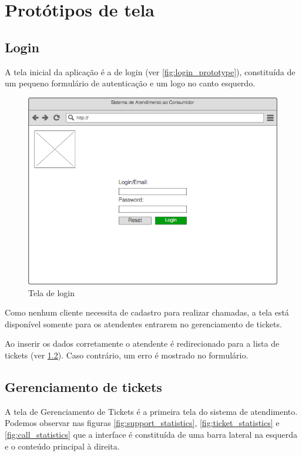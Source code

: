 \newpage
\section{Protótipos de tela}

\subsection{Login}

A tela inicial da aplicação é a de login (ver \autoref{fig:login_prototype}), constituída de um pequeno formulário de autenticação e um logo no canto esquerdo. 

\begin{figure}[ht!]
	\centering
    \includegraphics[scale=0.4]{figures/prototypes/login.png} 
	\caption{Tela de login}
	\label{fig:login_prototype}
\end{figure}

Como nenhum cliente necessita de cadastro para realizar chamadas, a tela está disponível somente para os atendentes entrarem no gerenciamento de tickets. 

 Ao inserir os dados corretamente o atendente é redirecionado para a lista de tickets (ver \ref{subsec:ticket_management}). Caso contrário, um erro é mostrado no formulário.

\subsection{Gerenciamento de tickets}\label{subsec:ticket_management}

A tela de Gerenciamento de Tickets é a primeira tela do sistema de atendimento. Podemos observar nas figuras \ref{fig:support_statistics}, \ref{fig:ticket_statistics} e \ref{fig:call_statistics} 
que a interface é constituída de uma barra lateral na esquerda e o conteúdo principal à direita. 

